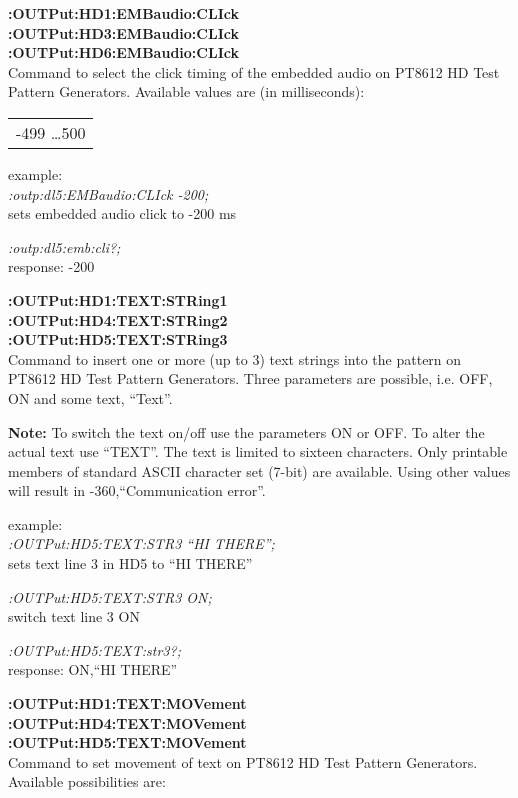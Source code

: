 \textbf{:OUTPut:HD1:EMBaudio:CLIck}\\
\textbf{:OUTPut:HD3:EMBaudio:CLIck}\\
\textbf{:OUTPut:HD6:EMBaudio:CLIck}\\
Command to select the click timing of the embedded audio on PT8612 HD Test Pattern Generators.  Available values are (in milliseconds):

\begin{tabular}{l}
    -499 \ldots 500 \\
\end{tabular}

example:\\
\textit{:outp:dl5:EMBaudio:CLIck -200;}\\
sets embedded audio click to -200 ms

\textit{:outp:dl5:emb:cli?;}\\
response: -200

\textbf{:OUTPut:HD1:TEXT:STRing1}\\
\textbf{:OUTPut:HD4:TEXT:STRing2}\\
\textbf{:OUTPut:HD5:TEXT:STRing3}\\
Command to insert one or more (up to 3) text strings into the pattern on PT8612 HD Test Pattern Generators. Three parameters are possible, i.e. OFF, ON and some text, ``Text''.

\textbf{Note:} To switch the text on/off use the parameters ON or OFF. To alter the actual text use ``TEXT''. The text is limited to sixteen characters. Only printable members of standard ASCII character set (7-bit) are available.  Using other values will result in -360,``Communication error''.

example:\\
\textit{:OUTPut:HD5:TEXT:STR3 ``HI THERE'';}\\
sets text line 3 in HD5 to ``HI THERE''

\textit{:OUTPut:HD5:TEXT:STR3 ON;}\\
switch text line 3 ON

\textit{:OUTPut:HD5:TEXT:str3?;}\\
response: ON,``HI THERE''

\textbf{:OUTPut:HD1:TEXT:MOVement}\\
\textbf{:OUTPut:HD4:TEXT:MOVement}\\
\textbf{:OUTPut:HD5:TEXT:MOVement}\\
Command to set movement of text on PT8612 HD Test Pattern Generators. Available possibilities are:

